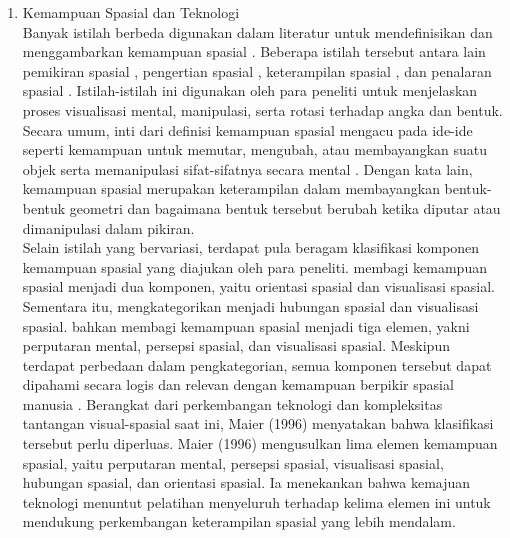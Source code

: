 \documentclass[12pt]{article}
\begin{document}
\begin{enumerate}
    \item Kemampuan Spasial dan Teknologi\\
    \hspace*{1cm}Banyak istilah berbeda digunakan dalam literatur untuk mendefinisikan dan menggambarkan kemampuan spasial \citep{ozcakir2021augmented}. Beberapa istilah tersebut antara lain pemikiran spasial \citep{yakimanskaya1991}, pengertian spasial \citep{nctm1989}, keterampilan spasial \citep{tartre1990}, dan penalaran spasial \citep{battista2007}. Istilah-istilah ini digunakan oleh para peneliti untuk menjelaskan proses visualisasi mental, manipulasi, serta rotasi terhadap angka dan bentuk. Secara umum, inti dari definisi kemampuan spasial mengacu pada ide-ide seperti kemampuan untuk memutar, mengubah, atau membayangkan suatu objek serta memanipulasi sifat-sifatnya secara mental \citep{ozcakir2021augmented}. Dengan kata lain, kemampuan spasial merupakan keterampilan dalam membayangkan bentuk-bentuk geometri dan bagaimana bentuk tersebut berubah ketika diputar atau dimanipulasi dalam pikiran.\\
    \hspace*{1cm}Selain istilah yang bervariasi, terdapat pula beragam klasifikasi komponen kemampuan spasial yang diajukan oleh para peneliti. \citet{battista1994} membagi kemampuan spasial menjadi dua komponen, yaitu orientasi spasial dan visualisasi spasial. Sementara itu, \citet{pellegrino1982} mengkategorikan menjadi hubungan spasial dan visualisasi spasial. \citet{linn1985} bahkan membagi kemampuan spasial menjadi tiga elemen, yakni perputaran mental, persepsi spasial, dan visualisasi spasial. Meskipun terdapat perbedaan dalam pengkategorian, semua komponen tersebut dapat dipahami secara logis dan relevan dengan kemampuan berpikir spasial manusia \citep{ozcakir2021augmented}. Berangkat dari perkembangan teknologi dan kompleksitas tantangan visual-spasial saat ini, Maier (1996) menyatakan bahwa klasifikasi tersebut perlu diperluas. Maier (1996) mengusulkan lima elemen kemampuan spasial, yaitu perputaran mental, persepsi spasial, visualisasi spasial, hubungan spasial, dan orientasi spasial. Ia menekankan bahwa kemajuan teknologi menuntut pelatihan menyeluruh terhadap kelima elemen ini untuk mendukung perkembangan keterampilan spasial yang lebih mendalam.\\

\end{enumerate}
\end{document}
